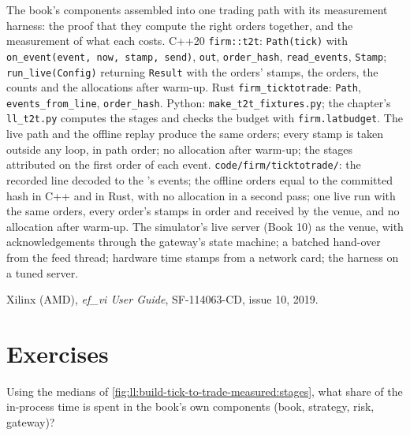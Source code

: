 \begin{build}
 The book's components assembled into one trading path with its measurement harness: the proof that they compute
the right orders together, and the measurement of what each costs.
 C++20 \texttt{firm::t2t}: \texttt{Path(tick)} with \texttt{on\_event(event, now, stamp, send)}, \texttt{out},
\texttt{order\_hash}, \texttt{read\_events}, \texttt{Stamp}; \texttt{run\_live(Config)} returning \texttt{Result} with the
orders' stamps, the orders, the counts and the allocations after warm-up. Rust \texttt{firm\_ticktotrade}: \texttt{Path},
\texttt{events\_from\_line}, \texttt{order\_hash}. Python: \texttt{make\_t2t\_fixtures.py}; the chapter's \texttt{ll\_t2t.py}
computes the stages and checks the budget with \texttt{firm.latbudget}.
 The live path and the offline replay produce the same orders; every stamp is taken outside any loop, in path order;
no allocation after warm-up; the stages attributed on the first order of each event.
 \texttt{code/firm/ticktotrade/}: the recorded line decoded to the 's events; the offline
orders equal to the committed hash in C++ and in Rust, with no allocation in a second pass; one live run with the same orders,
every order's stamps in order and received by the venue, and no allocation after warm-up.
 The simulator's live server (Book 10) as the venue, with acknowledgements through the gateway's state machine;
a batched hand-over from the feed thread; hardware time stamps from a network card; the harness on a tuned server.
\end{build}

\begin{omsources}
\item Xilinx (AMD), \emph{ef\_vi User Guide}, SF-114063-CD, issue 10, 2019.
\end{omsources}

\section{Exercises}

\begin{exercise}[$\star$]\label{exo:ll:build-tick-to-trade-measured:1}
Using the medians of \cref{fig:ll:build-tick-to-trade-measured:stages}, what share of the in-process time is spent in the
book's own components (book, strategy, risk, gateway)?
\end{exercise}

